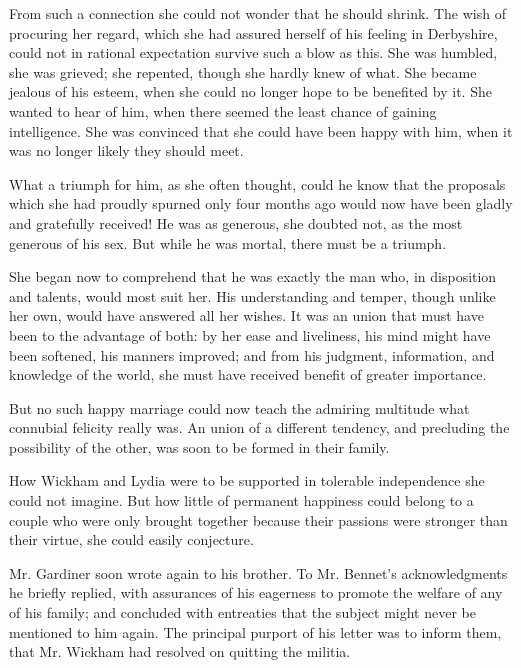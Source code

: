 \documentclass[10pt]{book}
\begin{document}
   From such a connection she could not wonder that he should shrink. The
wish of procuring her regard, which she had assured herself of his
feeling in Derbyshire, could not in rational expectation survive such a
blow as this. She was humbled, she was grieved; she repented, though she
hardly knew of what. She became jealous of his esteem, when she could no
longer hope to be benefited by it. She wanted to hear of him, when there
seemed the least chance of gaining intelligence. She was convinced
   that
she could have been happy with him, when it was no longer likely they
should meet.
  

   What a triumph for him, as she often thought, could he know that the
proposals which she had proudly spurned only four months ago would now
have been gladly and gratefully received! He was as generous, she
doubted not, as the most generous of his sex. But while he was mortal,
there must be a triumph.
  

   She began now to comprehend that he was exactly the man who, in
disposition and talents, would most suit her. His understanding and
temper, though unlike her own, would have answered all her wishes. It
was an union that must have been to the advantage of both: by her ease
and liveliness, his mind might have been softened, his manners improved;
and from his judgment, information, and knowledge of the world, she must
have received benefit of greater importance.
  

   But no such happy marriage could now teach the admiring multitude what
connubial felicity really was. An union of a different tendency, and
precluding the possibility of the other, was soon to be formed in their
family.
  

   How Wickham and Lydia were to be supported in tolerable independence she
could not imagine. But how little of permanent happiness could belong to
a couple who were only brought together because their passions were
stronger than their virtue, she could easily conjecture.
  

   Mr. Gardiner soon wrote again to his brother. To Mr. Bennet’s
acknowledgments he briefly replied, with assurances of his eagerness to
promote the welfare of any of his family; and concluded with entreaties
that the subject might never be mentioned to him again.
   The principal
purport of his letter was to inform them, that Mr. Wickham had resolved
on quitting the militia.
  
\end{document}
